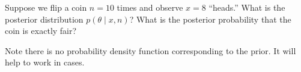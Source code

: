 \documentclass{article}
\newcommand{\given}{\mid}
\begin{document}
\begin{enumerate}
  Suppose we flip a coin $n = 10$ times and observe $x = 8$ ``heads.''
  What is the posterior distribution $p(\theta \given x, n)$?  What is
  the posterior probability that the coin is exactly fair?

  Note there is no probability density function corresponding to the
  prior. It will help to work in cases.

\end{enumerate}
\end{document}
